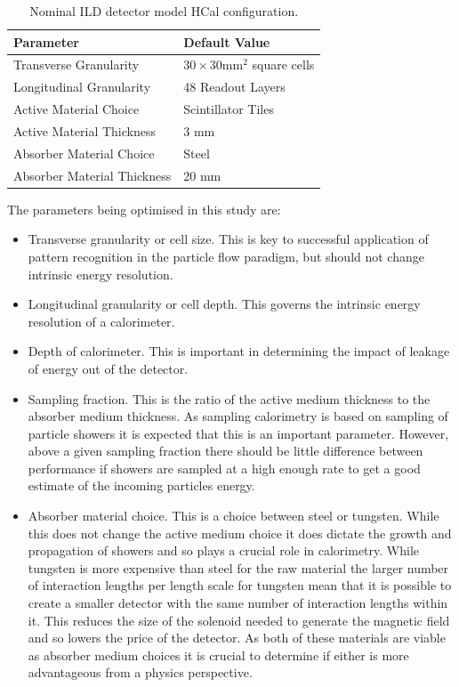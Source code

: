 \begin{table}[h!]
\centering
\begin{tabular}{ l l}
\hline
Parameter & Default Value \\
\hline
Transverse Granularity & $30 \times 30 \text{mm}^{2}$ square cells \\
Longitudinal Granularity & 48 Readout Layers \\
Active Material Choice & Scintillator Tiles  \\
Active Material Thickness & 3 mm  \\
Absorber Material Choice & Steel \\
Absorber Material Thickness & 20 mm \\
\hline
\end{tabular}
\caption[Nominal ILD detector model HCal configuration.]{Nominal ILD detector model HCal configuration.}
\label{table:defaultildhcal}
\end{table}


The parameters being optimised in this study are:
\begin{itemize}
\item Transverse granularity or cell size.  This is key to successful application of pattern recognition in the particle flow paradigm, but should not change intrinsic energy resolution.   
\item Longitudinal granularity or cell depth.  This governs the intrinsic energy resolution of a calorimeter.
\item Depth of calorimeter.  This is important in determining the impact of leakage of energy out of the detector.  
\item Sampling fraction.  This is the ratio of the active medium thickness to the absorber medium thickness.  As sampling calorimetry is based on sampling of particle showers it is expected that this is an important parameter.  However, above a given sampling fraction there should be little difference between performance if showers are sampled at a high enough rate to get a good estimate of the incoming particles energy.
\item Absorber material choice.  This is a choice between steel or tungsten.  While this does not change the active medium choice it does dictate the growth and propagation of showers and so plays a crucial role in calorimetry.  While tungsten is more expensive than steel for the raw material the larger number of interaction lengths per length scale for tungsten mean that it is possible to create a smaller detector with the same number of interaction lengths within it.  This reduces the size of the solenoid needed to generate the magnetic field and so lowers the price of the detector.  As both of these materials are viable as absorber medium choices it is crucial to determine if either is more advantageous from a physics perspective.  
\end{itemize}

